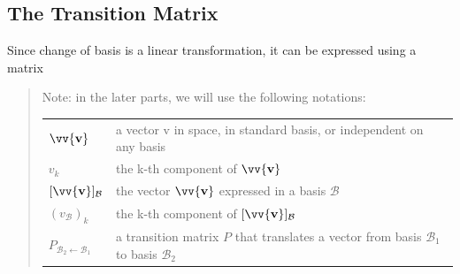 \documentclass[11pt]{article}
\DeclareRobustCommand{\myvec}[1]{\vv{\mathbf{#1}}}
\newcommand{\myset}[1]{\mathcal{#1}}
\newcommand{\mymat}[1]{#1}
\begin{document}
    \subsection{The Transition Matrix}
    Since change of basis is a linear transformation, it can be expressed using a matrix
    \begin{quote}
        Note: in the later parts, we will use the following notations: \vspace{\abovedisplayshortskip}

        \begin{tabular}{l l @{}}
            $\myvec{v}$ & a vector v in space, in standard basis, or independent on any basis \\[1ex]
            $v_k$ & the k-th component of $\myvec{v}$ \\[1ex]
            $[\myvec{v}]_\myset{B}$ & the vector $\myvec{v}$ expressed in a basis $\myset{B}$ \\[1ex]
            $(v_\myset{B})_k$ & the k-th component of $[\myvec{v}]_\myset{B}$ \\[1ex]
            $\mymat{P}_{\myset{B}_2\leftarrow\myset{B}_1}$ & a transition matrix $\mymat{P}$ that translates a vector from basis $\myset{B}_1$ to basis $\myset{B}_2$
        \end{tabular}
    \end{quote}
\end{document}
